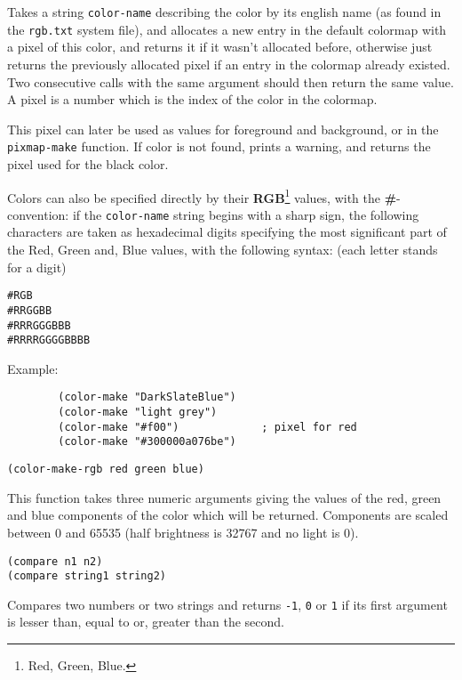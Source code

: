 Takes a string \verb"color-name" describing the color by its english name (as
found in the \verb"rgb.txt" system file), and allocates a new entry in the
default colormap with a pixel of this color, and returns it if it wasn't
allocated before, otherwise just returns the previously allocated pixel if an
entry in the colormap already existed. Two consecutive calls with the same
argument should then return the same value. A pixel is a number which is the
index of the color in the colormap.

This pixel can later be used as values for foreground and
background, or in the \verb"pixmap-make" function.  If color is not found,
prints a warning, and returns the pixel used for the black color.

Colors can also be specified directly by their {\bf RGB}\footnote{Red,
Green, Blue.} values, with the {\bf\#}-convention: if the \verb"color-name"
string begins with a sharp sign, the following characters are taken as
hexadecimal digits specifying the most significant part of the Red, Green
and, Blue values, with the following syntax: (each letter stands for a digit)

\begin{verbatim}
#RGB
#RRGGBB
#RRRGGGBBB
#RRRRGGGGBBBB
\end{verbatim}

Example:{\exemplefont\upspace\begin{verbatim}
        (color-make "DarkSlateBlue")
        (color-make "light grey")
        (color-make "#f00")             ; pixel for red
        (color-make "#300000a076be")
\end{verbatim}}


{\usagefont\begin{verbatim}
(color-make-rgb red green blue)
\end{verbatim}}\usageupspace

This function takes three numeric arguments giving the values of the red,
green and blue components of the color which will be returned. Components are
scaled between 0 and 65535 (half brightness is 32767 and no light is 0).


{\usagefont\begin{verbatim}
(compare n1 n2)
(compare string1 string2)
\end{verbatim}}\usageupspace

Compares two numbers or two strings and returns \verb"-1", \verb"0" or
\verb"1" if its first argument is lesser than, equal to or, greater than the
second.

